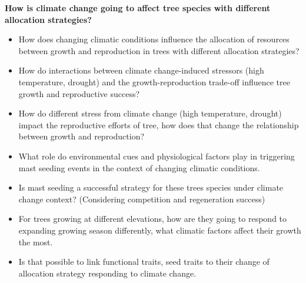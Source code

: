 \documentclass{article}
\begin{document}
\textbf{How is climate change going to affect tree species with different allocation strategies?}\\
\begin{itemize}
	
	\item How does changing climatic conditions influence the allocation of resources between growth and reproduction in trees with different allocation strategies?
	\item How do interactions between climate change-induced stressors (high temperature, drought) and the growth-reproduction trade-off influence tree growth and reproductive success?
	\item How do different stress from climate change (high temperature, drought) impact the reproductive efforts of tree, how does that change the relationship between growth and reproduction?
	\item What role do environmental cues and physiological factors play in triggering mast seeding events in the context of changing climatic conditions.
	\item Is mast seeding a successful strategy for these trees species under climate change context? (Considering competition and regeneration success)
	\item For trees growing at different elevations, how are they going to respond to expanding growing season differently, what climatic factors affect their growth the most.
	\item Is that possible to link functional traits, seed traits to their change of allocation strategy responding to climate change.

\end{itemize}
\end{document}
